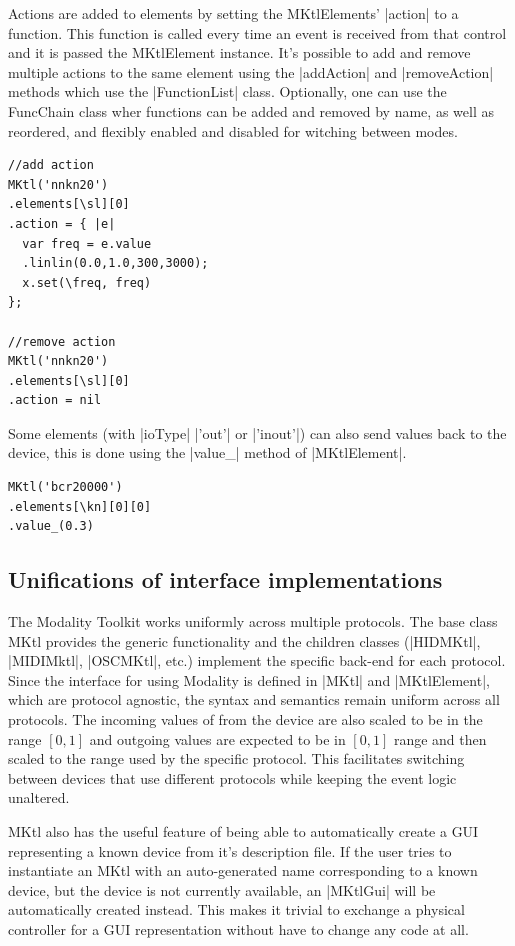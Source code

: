 \documentclass{article}
\begin{document}
Actions are added to elements by setting the MKtlElements' |action| to a function. This function is called every time an event is received from that control and it is passed the MKtlElement instance. It's possible to add and remove multiple actions to the same element using the |addAction| and |removeAction| methods which use the |FunctionList| class. Optionally, one can use the FuncChain class wher functions can be added and removed by name, as well as reordered, and flexibly enabled and disabled for witching between modes. 

\begin{Verbatim}
//add action
MKtl('nnkn20')
.elements[\sl][0]
.action = { |e|
  var freq = e.value
  .linlin(0.0,1.0,300,3000);
  x.set(\freq, freq)
};

//remove action
MKtl('nnkn20')
.elements[\sl][0]
.action = nil
\end{Verbatim}

Some elements (with |ioType| |'out'| or |'inout'|) can also send values back to the device, this is done using the |value_| method of |MKtlElement|.

\begin{Verbatim}	
MKtl('bcr20000')
.elements[\kn][0][0]
.value_(0.3)
\end{Verbatim}

\subsection{Unifications of interface implementations}
\label{sub:unifications_of_interface_implementations}

The Modality Toolkit works uniformly across multiple protocols. The base class MKtl provides the generic functionality and the children classes (|HIDMKtl|, |MIDIMktl|, |OSCMKtl|, etc.) implement the specific back-end for each protocol. Since the interface for using Modality is defined in |MKtl| and |MKtlElement|, which are protocol agnostic, the syntax and semantics remain uniform across all protocols. The incoming values of from the device are also scaled to be in the range $[0,1]$ and outgoing values are expected to be in $[0,1]$ range and then scaled to the range used by the specific protocol. This facilitates switching between devices that use different protocols while keeping the event logic unaltered.

MKtl also has the useful feature of being able to automatically create a GUI representing a known device from it's description file. If the user tries to instantiate an MKtl with an auto-generated name corresponding to a known device, but the device is not currently available, an |MKtlGui| will be automatically created instead. This makes it trivial to exchange a physical controller for a GUI representation without have to change any code at all.
\end{document}
